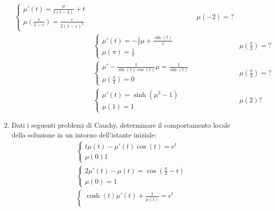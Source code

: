 \begin{enumerate}
\begin{align*}
\begin{cases}
			      \mu ' \left(t\right) = \frac{\mu }{t \left(t -1\right)} + t \\
			      \mu \left(\frac{e}{1 - e}\right) = \frac{e }{2 \left(1 - e\right)^2 }
		      \end{cases}
		       &   &
		      \mu \left(-2\right) =?                    \\
		       &
		      \begin{cases}
			      \mu ' \left(t\right) = -\frac{1}{t} \mu + \frac{\sin \left(t\right)}{t} \\
			      \mu \left(\pi \right) = \frac{1}{\pi }
		      \end{cases}
		       &   & \mu \left(\frac{\pi}{2}\right) = ? \\
		       &
		      \begin{cases}
			      \mu ' - \frac{1}{\sin \left(t\right) \cos \left(t\right)} \mu  = \frac{1}{\sin \left(t\right)} \\
			      \mu \left(\frac{\pi}{4}\right) = 0
		      \end{cases}
		       &   &
		      \mu \left(\frac{\pi}{3}\right) =?         \\
		       &
		      \begin{cases}
			      \mu ' \left(t\right) = \sinh \left(\mu ^3  -1\right) \\
			      \mu \left(1\right) = 1
		      \end{cases}
		       &   &
		      \mu \left(2\right) ?
	      \end{align*}
	\item Dati i seguenti problemi di Cauchy, determinare il comportamento locale della soluzione in un intorno dell'istante iniziale:
	      \begin{align*}
		       &
		      \begin{cases}
			      t \mu \left(t\right) - \mu ' \left(t\right) \cos \left(t\right) = e^{t} \\
			      \mu \left(0\right)1
		      \end{cases}
		      \\
		       &
		      \begin{cases}
			      2 \mu ' \left(t\right) - \mu  \left(t\right) = \cos \left(\frac{\pi }{2} - t\right) \\
			      \mu \left(0\right)= 1
		      \end{cases}
		      \\
		       &
		      \begin{cases}
			      \cosh \left(t\right) \mu ' \left(t\right) + \frac{1}{ \mu \left(t\right)} = e^{t} \\

\end{cases}
\end{align*}
\end{enumerate}
